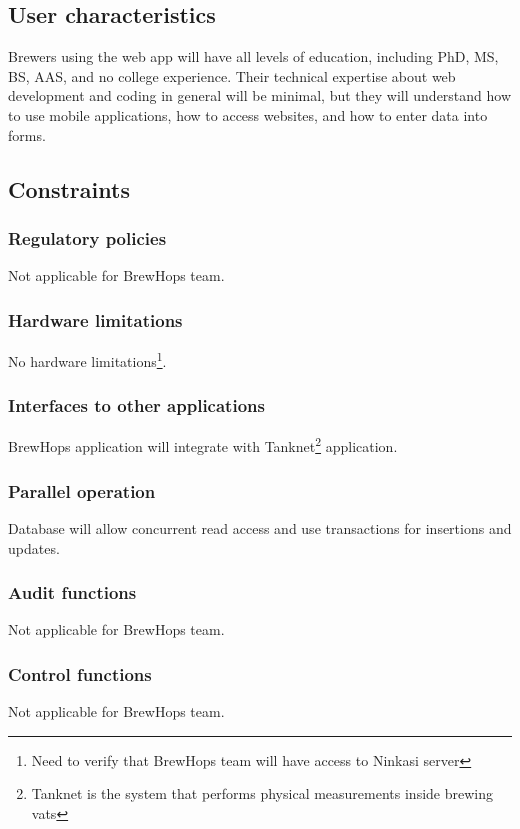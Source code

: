 \documentclass[draftclsnofoot,onecolumn,letterpaper,10pt,compsoc]{IEEEtran}
\begin{document}
	\subsection{User characteristics}
    Brewers using the web app will have all levels of education, including PhD, MS, BS, AAS, and no college experience. Their technical expertise about web development and coding in general will be minimal, but they will understand how to use mobile applications, how to access websites, and how to enter data into forms.

	\subsection{Constraints}
		\subsubsection{Regulatory policies}
        Not applicable for BrewHops team.

		\subsubsection{Hardware limitations}
        No hardware limitations\footnote{Need to verify that BrewHops team will have access to Ninkasi server}.

		\subsubsection{Interfaces to other applications}
        BrewHops application will integrate with Tanknet\footnote{Tanknet is the system that performs physical measurements inside brewing vats} application.

		\subsubsection{Parallel operation}
        Database will allow concurrent read access and use transactions for insertions and updates.

		\subsubsection{Audit functions}
        Not applicable for BrewHops team.

		\subsubsection{Control functions}
        Not applicable for BrewHops team.
\end{document}
